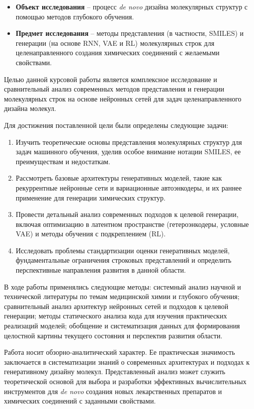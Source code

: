 \documentclass[../main.tex]{subfiles}
\begin{document}
\begin{itemize}
    \item \textbf{Объект исследования} -- процесс \textit{de novo} дизайна молекулярных структур с помощью методов глубокого обучения.
    \item \textbf{Предмет исследования} -- методы представления (в частности, SMILES) и генерации (на основе RNN, VAE и RL) молекулярных строк для целенаправленного создания химических соединений с желаемыми свойствами.
\end{itemize}

Целью данной курсовой работы является комплексное исследование и сравнительный анализ современных методов представления и генерации молекулярных строк на основе нейронных сетей для задач целенаправленного дизайна молекул.

Для достижения поставленной цели были определены следующие задачи:
\begin{enumerate}
    \item Изучить теоретические основы представления молекулярных структур для задач машинного обучения, уделив особое внимание нотации SMILES, ее преимуществам и недостаткам.
    \item Рассмотреть базовые архитектуры генеративных моделей, такие как рекуррентные нейронные сети и вариационные автоэнкодеры, и их раннее применение для генерации химических структур.
    \item Провести детальный анализ современных подходов к целевой генерации, включая оптимизацию в латентном пространстве (гетероэнкодеры, условные VAE) и методы обучения с подкреплением (RL).
    \item Исследовать проблемы стандартизации оценки генеративных моделей, фундаментальные ограничения строковых представлений и определить перспективные направления развития в данной области.
\end{enumerate}

В ходе работы применялись следующие методы: системный анализ научной и технической литературы по темам медицинской химии и глубокого обучения; сравнительный анализ архитектур нейронных сетей и подходов к целевой генерации; методы статического анализа кода для изучения практических реализаций моделей; обобщение и систематизация данных для формирования целостной картины текущего состояния и перспектив развития области.

Работа носит обзорно-аналитический характер. Ее практическая значимость заключается в систематизации знаний о современных архитектурах и подходах к генеративному дизайну молекул. Представленный анализ может служить теоретической основой для выбора и разработки эффективных вычислительных инструментов для \textit{de novo} создания новых лекарственных препаратов и химических соединений с заданными свойствами.
\end{document}
